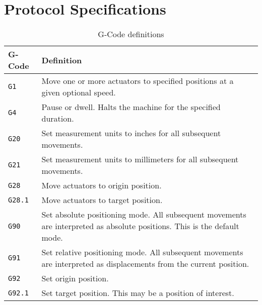 \section{Protocol Specifications}


\begingroup
\setlength{\tabcolsep}{10pt} %
\renewcommand{\arraystretch}{1.5} %
\begin{table}[]
    \centering
    \caption{G-Code definitions}
    \label{tab:g-definitions}
    \begin{tabular}{p{}p{}}
    \toprule
    G-Code & Definition \\ \midrule
    \texttt{G1} & Move one or more actuators to specified positions at a given optional speed. \\
    \texttt{G4} & Pause or dwell. Halts the machine for the specified duration. \\
    \texttt{G20} & Set measurement units to inches for all subsequent movements. \\
    \texttt{G21} & Set measurement units to millimeters for all subsequent movements. \\
    \texttt{G28} & Move actuators to origin position. \\
    \texttt{G28.1} & Move actuators to target position. \\
    \texttt{G90} & Set absolute positioning mode. All subsequent movements are interpreted as absolute positions. This is the default mode. \\
    \texttt{G91} & Set relative positioning mode. All subsequent movements are interpreted as displacements from the current position. \\
    \texttt{G92} & Set origin position. \\
    \texttt{G92.1} & Set target position. This may be a position of interest. \\ \bottomrule
    \end{tabular}
\end{table}
\endgroup

